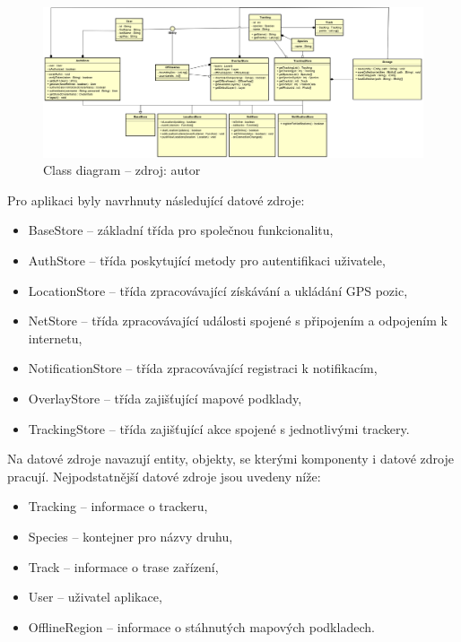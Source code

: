 \begin{figure}[H]
	\begin{center}
		\includegraphics[width=165mm]{img/classdiagram.png}
	\end{center}
	\caption[Class diagram]{Class diagram -- zdroj: autor}
\end{figure}

Pro aplikaci byly navrhnuty následující datové zdroje:

\begin{itemize}
	\item BaseStore -- základní třída pro společnou funkcionalitu,
	\item AuthStore -- třída poskytující metody pro autentifikaci uživatele,
	\item LocationStore -- třída zpracovávající získávání a ukládání GPS pozic,
	\item NetStore -- třída zpracovávající události spojené s připojením a odpojením k internetu,
	\item NotificationStore -- třída zpracovávající registraci k notifikacím,
	\item OverlayStore -- třída zajišťující mapové podklady,
	\item TrackingStore -- třída zajišťující akce spojené s jednotlivými trackery.
\end{itemize}

Na datové zdroje navazují entity, objekty, se kterými komponenty i datové zdroje pracují. Nejpodstatnější datové zdroje jsou uvedeny níže:

\begin{itemize}
	\item Tracking -- informace o trackeru,
	\item Species -- kontejner pro názvy druhu,
	\item Track -- informace o trase zařízení,
	\item User -- uživatel aplikace,
	\item OfflineRegion -- informace o stáhnutých mapových podkladech.
\end{itemize}

